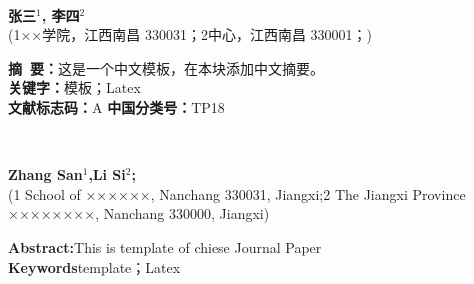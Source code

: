 \documentclass[a4paper,onecolumn,twoside]{article}
\begin{document}
  

    \thispagestyle{plain}
             \vspace{-3em}
            \begin{center}
              \parbox{\textwidth}{
                \begin{center}
                  {}\\
                \vspace{3pt}
                  \vspace{-0.0cm}
                \end{center}
                \begin{center}
                  \textbf{张三$^1$, 李四$^2$}\\[2pt]
                  \small{(1××学院，江西南昌 330031；2中心，江西南昌 330001；)}\\[2pt]
                \end{center}
                {\small{\textbf{摘~要：}这是一个中文模板，在本块添加中文摘要。
                \\
                
                \textbf{关键字：}模板；Latex\\
                \textbf{文献标志码：}A \hspace{4cm} \textbf{中国分类号：}TP18
              }}

              }
            \end{center}


            \begin{center}
              \parbox{\textwidth}{
                \begin{center}
                  {}\\
                  \vspace{-0.0cm}
                \end{center}
                \begin{center}
                  \textbf{Zhang San$^1$,Li Si$^2$;}\\[2pt]
                  \small{(1 School of ××××××, Nanchang 330031, Jiangxi;2 The
                  Jiangxi Province ××××××××, Nanchang 330000, Jiangxi)}\\[2pt]
                \end{center}
                {\small{\textbf{Abstract:}\quad This is template of chiese
                Journal Paper
                \\
                \textbf{Keywords}\quad template；Latex}}
              }
            \end{center}
\end{document}
